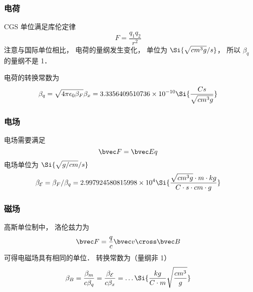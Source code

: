 
\begin{issues}
\issueDraft
\end{issues}


\subsubsection{电荷}
CGS 单位满足库伦定律
\begin{equation}
F = \frac{q_1 q_2}{r^2}
\end{equation}
注意与国际单位相比， 电荷的量纲发生变化， 单位为 $\Si{\sqrt{cm^3 g}/s}$， 所以 $\beta_q$ 的量纲不是 1．

电荷的转换常数为
\begin{equation}
\beta_q = \sqrt{4\pi\epsilon_0\beta_F} \beta_x = 3.3356409510736\times 10^{-10} \Si{\frac{Cs}{\sqrt{cm^3 g}}}
\end{equation}

\subsubsection{电场}
电场需要满足
\begin{equation}
\bvec F = \bvec E q
\end{equation}
电场单位为 $\Si{\sqrt{g/cm}/s}$
\begin{equation}
\beta_{\mathcal E} = \beta_F/\beta_q = 2.997924580815998\times 10^4 \Si{\frac{\sqrt{cm^3 g}\cdot m\cdot kg}{C\cdot s\cdot cm\cdot g}}
\end{equation}

\subsubsection{磁场}
高斯单位制中， 洛伦兹力为
\begin{equation}
\bvec F = \frac{q}{c} \bvec v \cross \bvec B
\end{equation}
可得电磁场具有相同的单位． 转换常数为（量纲非 1）
\begin{equation}
\beta_B = \frac{\beta_m}{c\beta_q} = \frac{\beta_{\mathcal E}}{c\beta_x} = \dots \Si{\frac{kg}{C\cdot m}\sqrt{\frac{cm^3}{g}}}
\end{equation}

